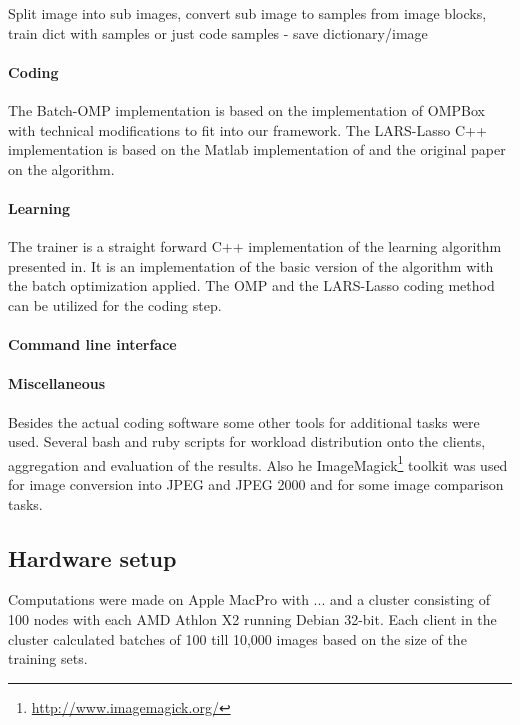 
Split image into sub images, convert sub image to samples from image blocks, 
train dict with samples or just code samples - save dictionary/image


\paragraph{Coding}
The Batch-OMP implementation is based on the implementation
of \cite{Rubinstein} OMPBox with technical modifications to fit into our
framework. The LARS-Lasso C++ implementation is based on the Matlab
implementation of\cite{Strand2005} and the original
paper\cite{Efron2004} on the algorithm.

\paragraph{Learning}
The \trainDL  trainer is a straight forward C++ implementation of the
learning algorithm presented in\cite{Mairal2010}. It is an implementation of the
basic version of the algorithm with the batch optimization applied. The OMP and
the LARS-Lasso coding method can be utilized for the coding step.


\paragraph{Command line interface}
%

\paragraph{Miscellaneous}
Besides the actual coding software some other tools for
additional tasks were used. Several bash and ruby scripts for workload
distribution onto the clients, aggregation and evaluation of the results.
Also he ImageMagick\footnote{\url{http://www.imagemagick.org/}} toolkit was used
for image conversion into JPEG and JPEG 2000 and for some image comparison
tasks.

\subsection*{Hardware setup}
Computations were made on Apple MacPro with ... 
and a cluster consisting of 100 nodes with each AMD Athlon X2  running Debian 32-bit. Each client in the cluster calculated batches of
100 till 10,000 images based on the size of the training sets.